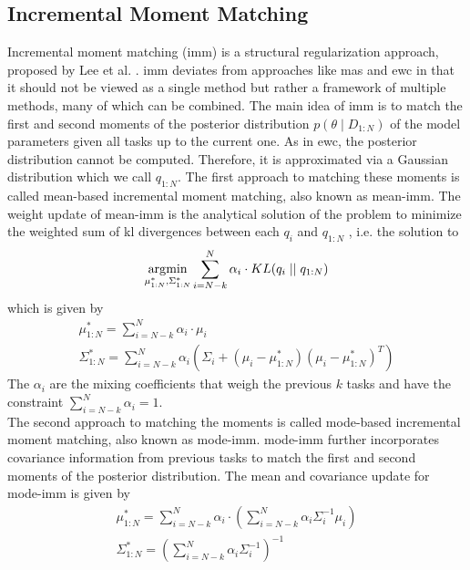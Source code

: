 \subsection{Incremental Moment Matching}
\label{sec:Related_work:Continual_Learning:IMM}
Incremental moment matching (\gls{imm}) is a structural regularization approach, proposed by Lee et al. \cite{lee2017overcoming}.
\gls{imm} deviates from approaches like \gls{mas} and \gls{ewc} in that it should not be viewed as a single method but rather a framework of multiple methods,
many of which can be combined. The main idea of \gls{imm} is to match the first and second moments of the posterior distribution $p(\theta \mid D_{1:N})$ of the model 
parameters given all tasks up to the current one. As in \gls{ewc}, the posterior distribution cannot be computed. Therefore, it is approximated via a Gaussian distribution which
we call $q_{1:N}$. The first approach to matching these moments is called mean-based incremental moment matching, also known as mean-\gls{imm}. The weight
update of mean-\gls{imm} is the analytical solution of the problem to minimize the weighted sum of \gls{kl} divergences between each $q_i$ and $q_{1:N}$
\cite{goldberger2004hierarchical}, i.e. the solution to
\begin{equation}
    \operatorname*{\arg\!\min}_{\mu^*_{1:N},\Sigma^*_{1:N}} \sum_{i=N-k}^N \alpha_i \cdot KL(q_i \mid \mid q_{1:N})
\end{equation}
which is given by
\begin{gather}
    \mu^*_{1:N} = \sum_{i=N-k}^N \alpha_i \cdot \mu_i \\
    \Sigma^*_{1:N} = \sum_{i=N-k}^N \alpha_i (\Sigma_i + (\mu_i - \mu^*_{1:N})(\mu_i - \mu^*_{1:N})^T)
\end{gather}
The $\alpha_i$ are the mixing coefficients that weigh the previous $k$ tasks and have the constraint $\sum_{i=N-k}^N \alpha_i = 1$.  \\
The second approach to matching the moments is called mode-based incremental moment matching, also known as mode-\gls{imm}. mode-\gls{imm}
further incorporates covariance information from previous tasks to match the first and second moments of the posterior distribution. 
The mean and covariance update for mode-\gls{imm} is given by
\begin{gather}
    \mu^*_{1:N} = \sum_{i=N-k}^N \alpha_i \cdot (\sum_{i=N-k}^N \alpha_i \Sigma_i^{-1} \mu_i) \\
    \Sigma^*_{1:N} = (\sum_{i=N-k}^N \alpha_i  \Sigma_i^{-1})^{-1}
\end{gather}
